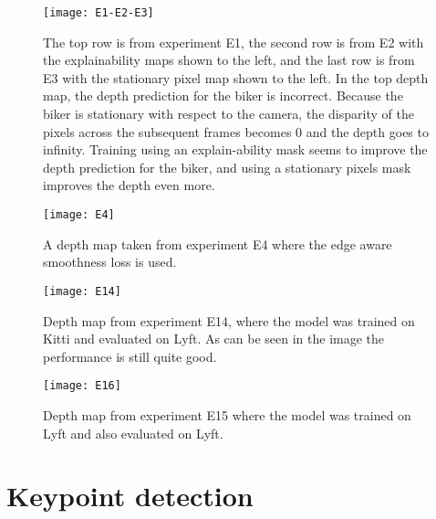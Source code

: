 \begin{figure}[H]
	\centering
	\texttt{[image: E1-E2-E3]}
	\caption{The top row is from experiment E1, the second row is from E2 with the explainability maps shown to the left, and the last row is from E3 with the stationary pixel map shown to the left. In the top depth map, the depth prediction for the biker is incorrect. Because the biker is stationary with respect to the camera, the disparity of the pixels across the subsequent frames becomes 0 and the depth goes to infinity. Training using an explain-ability mask seems to improve the depth prediction for the biker, and using a stationary pixels mask improves the depth even more.}
	\label{fig:e1e2e3}
\end{figure}

\begin{figure}[H]
	\centering
	\texttt{[image: E4]}
	\caption{A depth map taken from experiment E4 where the edge aware smoothness loss is used.}
	\label{fig:E4}
\end{figure}

\begin{figure}[H]
	\centering
	\texttt{[image: E14]}
	\caption{Depth map from experiment E14, where the model was trained on Kitti and evaluated on Lyft. As can be seen in the image the performance is still quite good.}
	\label{fig:E14}
\end{figure}

\begin{figure}[H]
	\centering
	\texttt{[image: E16]}
	\caption{Depth map from experiment E15 where the model was trained on Lyft and also evaluated on Lyft.}
	\label{fig:E16}
\end{figure}

\iffalse
\begin{figure}[H]
	\centering
	\texttt{[image: evaluation]}
	\caption{Evaluation metrics when testing the configurations on the testing split of the datasets}
	\label{fig:evaluation}
\end{figure}

\begin{figure}[H]
	\centering
	\texttt{[image: depthmapslyft]}
	\caption{Examples from the Lyft dataset}
	\label{fig:depthmaplyft}
\end{figure}
\fi


\section{Keypoint detection}

